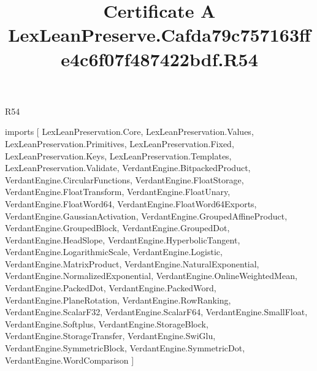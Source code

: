 \begin{lexlean}{R54}
\title{Certificate A LexLeanPreserve.Cafda79c757163ffe4c6f07f487422bdf.R54}
\begin{coremodule}
imports [
  LexLeanPreservation.Core,
  LexLeanPreservation.Values,
  LexLeanPreservation.Primitives,
  LexLeanPreservation.Fixed,
  LexLeanPreservation.Keys,
  LexLeanPreservation.Templates,
  LexLeanPreservation.Validate,
  VerdantEngine.BitpackedProduct,
  VerdantEngine.CircularFunctions,
  VerdantEngine.FloatStorage,
  VerdantEngine.FloatTransform,
  VerdantEngine.FloatUnary,
  VerdantEngine.FloatWord64,
  VerdantEngine.FloatWord64Exports,
  VerdantEngine.GaussianActivation,
  VerdantEngine.GroupedAffineProduct,
  VerdantEngine.GroupedBlock,
  VerdantEngine.GroupedDot,
  VerdantEngine.HeadSlope,
  VerdantEngine.HyperbolicTangent,
  VerdantEngine.LogarithmicScale,
  VerdantEngine.Logistic,
  VerdantEngine.MatrixProduct,
  VerdantEngine.NaturalExponential,
  VerdantEngine.NormalizedExponential,
  VerdantEngine.OnlineWeightedMean,
  VerdantEngine.PackedDot,
  VerdantEngine.PackedWord,
  VerdantEngine.PlaneRotation,
  VerdantEngine.RowRanking,
  VerdantEngine.ScalarF32,
  VerdantEngine.ScalarF64,
  VerdantEngine.SmallFloat,
  VerdantEngine.Softplus,
  VerdantEngine.StorageBlock,
  VerdantEngine.StorageTransfer,
  VerdantEngine.SwiGlu,
  VerdantEngine.SymmetricBlock,
  VerdantEngine.SymmetricDot,
  VerdantEngine.WordComparison
]


\end{coremodule}
\end{lexlean}
